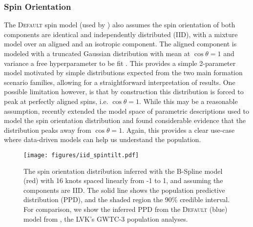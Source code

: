 \subsubsection{Spin Orientation}

The \textsc{Default} spin model (used by \citet{o3b_astro_dist}) also assumes the spin orientation of both components are identical and independently distributed (IID), with a mixture model over an
aligned and an isotropic component. The aligned component is modeled with a truncated Gaussian distribution with mean at $\cos{\theta}=1$ and variance a free 
hyperparameter to be fit \citep{Talbot_2017,Wysocki_2019,o3a_pop,o3b_astro_dist}. This provides a simple 2-parameter model motivated by simple distributions expected from the two main formation scenario families, allowing 
for a straightforward interpretation of results. One possible limitation however, is that by construction this distribution is forced to peak at perfectly aligned spins, 
i.e. $\cos{\theta}=1$. While this may be a reasonable assumption, \citet{spinitasyoulike} recently extended the model space of parametric descriptions 
used to model the spin orientation distribution and found considerable evidence that the distribution peaks away from $\cos{\theta}=1$. Again, this provides a clear 
use-case where data-driven models can help us understand the population.

\begin{figure}
    \begin{centering}
        \texttt{[image: figures/iid\_spintilt.pdf]}
        \caption{The spin orientation distribution inferred with the B-Spline model (red) with 16 knots spaced linearly from -1 to 1, and assuming the components are IID. The solid line shows the population predictive distribution (PPD), and the shaded region the 90\% credible interval. 
        For comparison, we show the inferred PPD from the \textsc{Default} (blue) model from \citet{o3b_astro_dist}, the LVK's GWTC-3 population analyses.}
        \label{fig:iid_spintilt_dist}
    \end{centering}
\end{figure}

